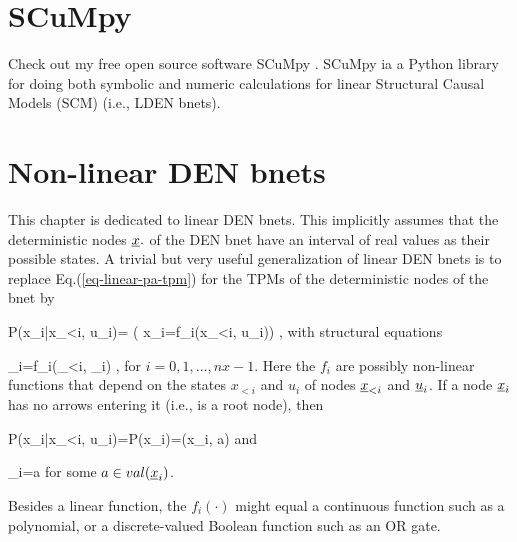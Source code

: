 \section{SCuMpy}
Check out my free open source
software SCuMpy \cite{scumpy}.
SCuMpy ia a Python library for doing both symbolic and numeric calculations for linear Structural Causal Models (SCM) (i.e., LDEN bnets).


\section{Non-linear DEN bnets}
This chapter 
is dedicated to
linear DEN bnets. This
implicitly
assumes that 
the deterministic
nodes $\rvx.$
of the 
DEN bnet have
an interval of
real values as their
possible states.
A trivial
but very useful
generalization
of linear DEN bnets is to
replace Eq.(\ref{eq-linear-pa-tpm})
for the TPMs
of the
deterministic nodes
of the bnet by

\beq\color{blue}
P(x_i|x_{<i}, u_i)=
\indi(
x_i=f_i(x_{<i}, u_i))
\;,
\label{eq-nonlinear-pa-tpm}
\eeq
with structural equations

\beq
\rvx_i=f_i(\rvx_{<i}, \rvu_i)
\;,
\label{eq-pa-nonlinear-struc}
\eeq
for $i=0, 1, \ldots, nx-1$.
Here the $f_i$ are 
possibly non-linear
functions
that depend on
the states
$x_{<i}$ and $u_i$
of nodes $\rvx_{<i}$
and $\rvu_i$.
If a node $\rvx_i$
has no arrows
entering it (i.e., is
a root node), then

\beq\color{blue}
P(x_i|x_{<i}, u_i)=P(x_i)=\delta(x_i, a)
\eeq
and

\beq
\rvx_i=a
\eeq
for some $a\in val(\rvx_i)$.


Besides a linear function, the
$f_i(\cdot)$
might equal a
continuous function
such as a polynomial,
or a discrete-valued Boolean
function
such as an OR gate.



